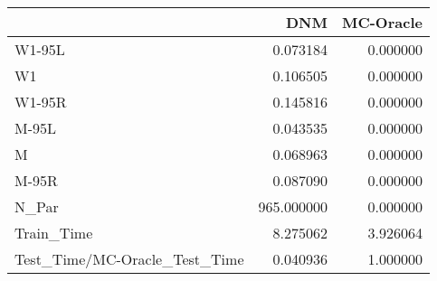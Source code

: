 \begin{tabular}{lrr}
\toprule
{} &         DNM &  MC-Oracle \\
\midrule
W1-95L                        &    0.073184 &   0.000000 \\
W1                            &    0.106505 &   0.000000 \\
W1-95R                        &    0.145816 &   0.000000 \\
M-95L                         &    0.043535 &   0.000000 \\
M                             &    0.068963 &   0.000000 \\
M-95R                         &    0.087090 &   0.000000 \\
N\_Par                         &  965.000000 &   0.000000 \\
Train\_Time                    &    8.275062 &   3.926064 \\
Test\_Time/MC-Oracle\_Test\_Time &    0.040936 &   1.000000 \\
\bottomrule
\end{tabular}

